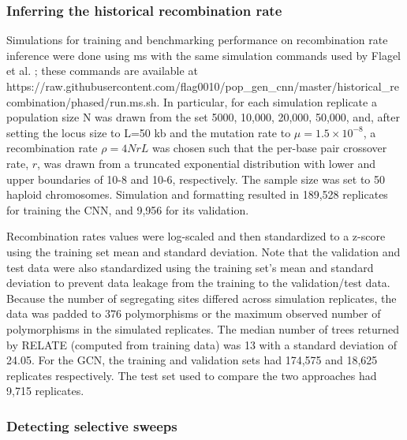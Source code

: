 \subsubsection{Inferring the historical recombination rate}

Simulations for training and benchmarking performance on recombination rate inference were done using ms \cite{hudsonGeneratingSamplesWright2002} with the same simulation commands used by Flagel et al. \cite{flagelUnreasonableEffectivenessConvolutional2019}; these commands are available at https://raw.githubusercontent.com/flag0010/pop\_gen\_cnn/master/historical\_recombination/phased/run.ms.sh. In particular, for each simulation replicate a population size N was drawn from the set {5000, 10,000, 20,000, 50,000}, and, after setting the locus size to L=50 kb and the mutation rate to $\mu=1.5\times10^{-8}$, a recombination rate $\rho=4NrL$ was chosen such that the per-base pair crossover rate, $r$, was drawn from a truncated exponential distribution with lower and upper boundaries of 10-8 and 10-6, respectively. The sample size was set to 50 haploid chromosomes. Simulation and formatting resulted in 189,528 replicates for training the CNN, and 9,956 for its validation.

Recombination rates values were log-scaled and then standardized to a z-score using the training set mean and standard deviation. Note that the validation and test data were also standardized using the training set’s mean and standard deviation to prevent data leakage from the training to the validation/test data. Because the number of segregating sites differed across simulation replicates, the data was padded to 376 polymorphisms or the maximum observed number of polymorphisms in the simulated replicates. The median number of trees returned by RELATE (computed from training data) was 13 with a standard deviation of 24.05.  For the GCN, the training and validation sets had 174,575 and 18,625 replicates respectively.  The test set used to compare the two approaches had 9,715 replicates.

\subsubsection{Detecting selective sweeps}

